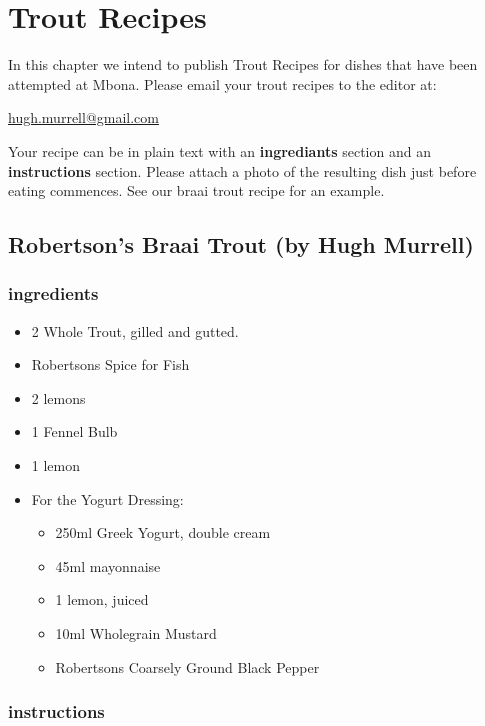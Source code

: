 \chapter{Trout Recipes}

In this chapter we intend to publish Trout Recipes for dishes that have been 
attempted at Mbona. Please email your trout recipes to the editor at:

\href{mailto:hugh.murrell@gmail.com}{hugh.murrell@gmail.com}

Your recipe can be in plain text with an {\bf ingrediants} section
and an {\bf instructions} section. Please attach a photo of the resulting
dish just before eating commences. See our braai trout recipe for an example.

\clearpage


\section{Robertson's Braai Trout  (by Hugh Murrell)}

\subsection*{ingredients}

\begin{itemize}
\item 2 Whole Trout, gilled and gutted.
\item Robertsons Spice for Fish
\item 2 lemons
\item 1 Fennel Bulb
\item 1 lemon
\item For the Yogurt Dressing:
\begin{itemize}
\item 250ml Greek Yogurt, double cream
\item 45ml mayonnaise
\item 1 lemon, juiced
\item 10ml Wholegrain Mustard
\item Robertsons Coarsely Ground Black Pepper
\end{itemize}
\end{itemize}

\subsection*{instructions}

